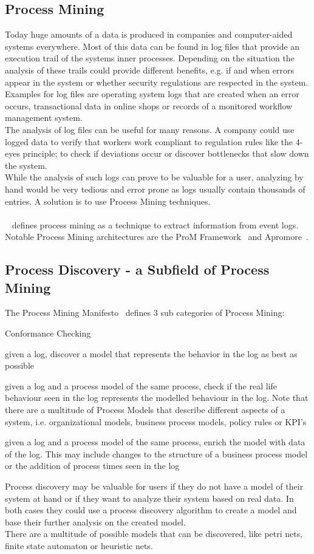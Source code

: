 \documentclass[
	a4paper,
	pagesize,
	pdftex,
	12pt,
	twoside, %
	BCOR=5mm, %
	ngerman,
	fleqn,
	final,
	]{scrartcl}
\begin{document}
\subsection{Process Mining}
Today huge amounts of a data is produced in companies and computer-aided systems everywhere. Most of this data can be found in log files that provide an execution trail of the systems inner processes.
Depending on the situation the analysis of these trails could provide different benefits, e.g. if and when errors appear in the system or whether security regulations are respected in the system. Examples for log files are operating system logs that are created when an error occurs, transactional data in online shops or records of a monitored workflow management system.\\ The analysis of log files can be useful for many reasons. A company could use logged data to verify that workers work compliant to regulation rules like the 4-eyes principle; to check if deviations occur or discover bottlenecks that slow down the system.\\
While the analysis of such logs can prove to be valuable for a user, analyzing by hand would be very tedious and error prone as logs usually contain thousands of entries. A solution is to use Process Mining techniques.\\\\
~\cite{PromPage} defines process mining as a technique to extract information from event logs.
Notable Process Mining architectures are the ProM Framework~\cite{ProM} and Apromore~\cite{Apromore}.
\subsection{Process Discovery - a Subfield of Process Mining}
The Process Mining Manifesto~\cite{ProcessMiningManifesto} defines 3 sub categories of Process Mining:
\begin{labeling}{Conformance Checking}

\item[Process Discovery] given a log, discover a model that represents the behavior in the log as best as possible
\item[Conformance Checking] given a log and a process model of the same process, check if the real life behaviour seen in the log represents the modelled behaviour in the log. Note that there are a multitude of Process Models that describe different aspects of a system, i.e. organizational models, business process models, policy rules or KPI's
\item[Model Enhancement] given a log and a process model of the same process, enrich the model with data of the log. This may include changes to the structure of a business process model or the addition of process times seen in the log
\end{labeling}
Process discovery may be valuable for users if they do not have a model of their system at hand or if they want to analyze their system based on real data. In both cases they could use a process discovery algorithm to create a model and base their further analysis on the created model.\\
There are a multitude of possible models that can be discovered, like petri nets, finite state automaton or heuristic nets.
\end{document}
